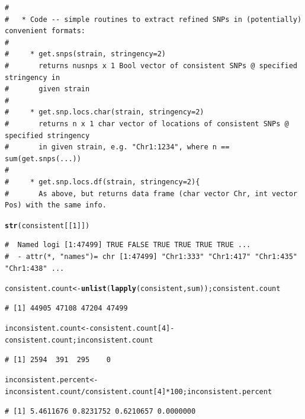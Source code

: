 \documentclass{article}\usepackage[]{graphicx}\usepackage[]{color}
\makeatletter
\newcommand{\hlnum}[1]{\textcolor[rgb]{0.686,0.059,0.569}{#1}}%
\newcommand{\hlopt}[1]{\textcolor[rgb]{0,0,0}{#1}}%
\newcommand{\hlstd}[1]{\textcolor[rgb]{0.345,0.345,0.345}{#1}}%
\newcommand{\hlkwb}[1]{\textcolor[rgb]{0.69,0.353,0.396}{#1}}%
\newcommand{\hlkwd}[1]{\textcolor[rgb]{0.737,0.353,0.396}{\textbf{#1}}}%
\newenvironment{kframe}{%
 \def\at@end@of@kframe{}%
 \ifinner\ifhmode%
  \def\at@end@of@kframe{\end{minipage}}%
  \begin{minipage}{\columnwidth}%
 \fi\fi%
 \def\FrameCommand##1{\hskip\@totalleftmargin \hskip-\fboxsep
 \colorbox{shadecolor}{##1}\hskip-\fboxsep
     \hskip-\linewidth \hskip-\@totalleftmargin \hskip\columnwidth}%
 \MakeFramed {\advance\hsize-\width
   \@totalleftmargin\z@ \linewidth\hsize
   \@setminipage}}%
 {\par\unskip\endMakeFramed%
 \at@end@of@kframe}
\newenvironment{knitrout}{}{} %
\makeatother
\begin{document}
\begin{knitrout}
\begin{kframe}
\begin{verbatim}
# 
#   * Code -- simple routines to extract refined SNPs in (potentially) convenient formats:
# 
#     * get.snps(strain, stringency=2)
#       returns nusnps x 1 Bool vector of consistent SNPs @ specified stringency in
#       given strain
# 
#     * get.snp.locs.char(strain, stringency=2)
#       returns n x 1 char vector of locations of consistent SNPs @ specified stringency
#       in given strain, e.g. "Chr1:1234", where n == sum(get.snps(...))
# 
#     * get.snp.locs.df(strain, stringency=2){
#       As above, but returns data frame (char vector Chr, int vector Pos) with the same info.
\end{verbatim}
\end{kframe}
\end{knitrout}
\begin{knitrout}\tiny
{}\color{fgcolor}\begin{kframe}
\begin{alltt}
\hlkwd{str}\hlstd{(consistent[[}\hlnum{1}\hlstd{]])}
\end{alltt}
\begin{verbatim}
#  Named logi [1:47499] TRUE FALSE TRUE TRUE TRUE TRUE ...
#  - attr(*, "names")= chr [1:47499] "Chr1:333" "Chr1:417" "Chr1:435" "Chr1:438" ...
\end{verbatim}
\end{kframe}
\end{knitrout}
\begin{knitrout}\footnotesize
{}\color{fgcolor}\begin{kframe}
\begin{alltt}
\hlstd{consistent.count} \hlkwb{<-} \hlkwd{unlist}\hlstd{(}\hlkwd{lapply}\hlstd{(consistent, sum)) ; consistent.count}
\end{alltt}
\begin{verbatim}
# [1] 44905 47108 47204 47499
\end{verbatim}
\begin{alltt}
\hlstd{inconsistent.count} \hlkwb{<-} \hlstd{consistent.count[}\hlnum{4}\hlstd{]} \hlopt{-} \hlstd{consistent.count; inconsistent.count}
\end{alltt}
\begin{verbatim}
# [1] 2594  391  295    0
\end{verbatim}
\begin{alltt}
\hlstd{inconsistent.percent} \hlkwb{<-} \hlstd{inconsistent.count}\hlopt{/}\hlstd{consistent.count[}\hlnum{4}\hlstd{]}\hlopt{*}\hlnum{100}\hlstd{; inconsistent.percent}
\end{alltt}
\begin{verbatim}
# [1] 5.4611676 0.8231752 0.6210657 0.0000000
\end{verbatim}
\end{kframe}
\end{knitrout}
\end{document}
